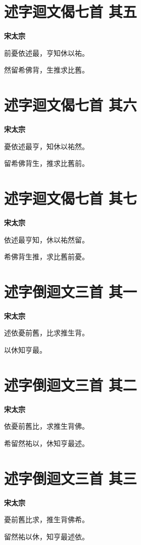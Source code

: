 \documentclass[12pt,a4paper]{ctexbook}
\begin{document}
\section{述字迴文偈七首  其五}
\textbf{宋太宗}\par\vspace{0.5em}
前憂依述最，亨知休以祐。\par
然留希佛背，生推求比舊。\par

\section{述字迴文偈七首  其六}
\textbf{宋太宗}\par\vspace{0.5em}
憂依述最亨，知休以祐然。\par
留希佛背生，推求比舊前。\par

\section{述字迴文偈七首  其七}
\textbf{宋太宗}\par\vspace{0.5em}
依述最亨知，休以祐然留。\par
希佛背生推，求比舊前憂。\par

\section{述字倒迴文三首  其一}
\textbf{宋太宗}\par\vspace{0.5em}
述依憂前舊，比求推生背。\par
以休知亨最。\par

\section{述字倒迴文三首  其二}
\textbf{宋太宗}\par\vspace{0.5em}
依憂前舊比，求推生背佛。\par
希留然祐以，休知亨最述。\par

\section{述字倒迴文三首  其三}
\textbf{宋太宗}\par\vspace{0.5em}
憂前舊比求，推生背佛希。\par
留然祐以休，知亨最述依。\par
\end{document}
